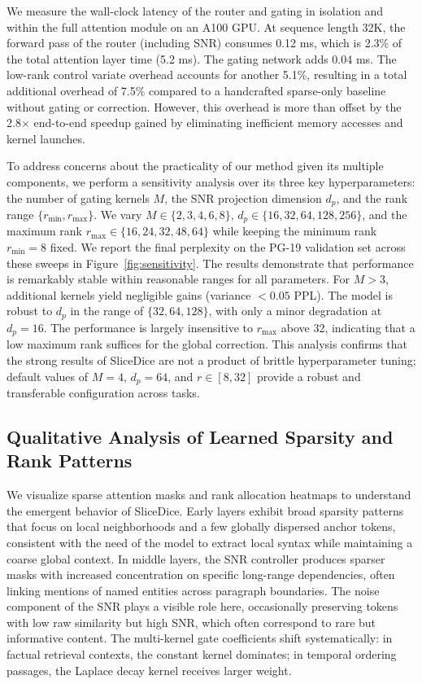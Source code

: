 \documentclass{article}
\begin{document}
We measure the wall-clock latency of the router and gating in isolation and within the full attention module on an A100 GPU. At sequence length 32K, the forward pass of the router (including SNR) consumes 0.12 ms, which is 2.3\% of the total attention layer time (5.2 ms). The gating network adds 0.04 ms. The low-rank control variate overhead accounts for another 5.1\%, resulting in a total additional overhead of 7.5\% compared to a handcrafted sparse-only baseline without gating or correction. However, this overhead is more than offset by the 2.8$\times$ end-to-end speedup gained by eliminating inefficient memory accesses and kernel launches.

To address concerns about the practicality of our method given its multiple components, we perform a sensitivity analysis over its three key hyperparameters: the number of gating kernels $M$, the SNR projection dimension $d_p$, and the rank range $\{r_{\min}, r_{\max}\}$. We vary $M \in \{2, 3, 4, 6, 8\}$, $d_p \in \{16, 32, 64, 128, 256\}$, and the maximum rank $r_{\max} \in \{16, 24, 32, 48, 64\}$ while keeping the minimum rank $r_{\min}=8$ fixed. We report the final perplexity on the PG-19 validation set across these sweeps in Figure~\ref{fig:sensitivity}. The results demonstrate that performance is remarkably stable within reasonable ranges for all parameters. For $M > 3$, additional kernels yield negligible gains (variance $< 0.05$ PPL). The model is robust to $d_p$ in the range of $\{32, 64, 128\}$, with only a minor degradation at $d_p=16$. The performance is largely insensitive to $r_{\max}$ above 32, indicating that a low maximum rank suffices for the global correction. This analysis confirms that the strong results of SliceDice are not a product of brittle hyperparameter tuning; default values of $M=4$, $d_p=64$, and $r \in [8, 32]$ provide a robust and transferable configuration across tasks.

\subsection{Qualitative Analysis of Learned Sparsity and Rank Patterns}

We visualize sparse attention masks and rank allocation heatmaps to understand the emergent behavior of SliceDice. Early layers exhibit broad sparsity patterns that focus on local neighborhoods and a few globally dispersed anchor tokens, consistent with the need of the model to extract local syntax while maintaining a coarse global context. In middle layers, the SNR controller produces sparser masks with increased concentration on specific long-range dependencies, often linking mentions of named entities across paragraph boundaries. The noise component of the SNR plays a visible role here, occasionally preserving tokens with low raw similarity but high SNR, which often correspond to rare but informative content. The multi-kernel gate coefficients shift systematically: in factual retrieval contexts, the constant kernel dominates; in temporal ordering passages, the Laplace decay kernel receives larger weight.
\end{document}
